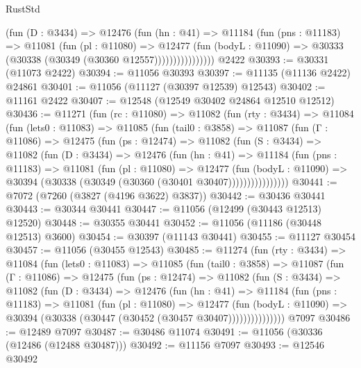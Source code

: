 \begin{lexlean}{RustStd}
\begin{coremodule}
                    (fun (D : @3434) =>
                    @12476
                      (fun (hn : @41) =>
                      @11184
                        (fun (pns : @11183) =>
                        @11081
                          (fun (pl : @11080) =>
                          @12477
                            (fun (bodyL : @11090) =>
                            @30333 (@30338 (@30349 (@30360 @12557))))))))))))))))
    @2422
@30393 := @30331 (@11073 @2422)
@30394 := @11056 @30393
@30397 := @11135 (@11136 @2422) @24861
@30401 := @11056 (@11127 (@30397 @12539) @12543)
@30402 := @11161 @2422
@30407 := @12548 (@12549 @30402 @24864 @12510 @12512)
@30436 := @11271
    (fun (rc : @11080) =>
    @11082
      (fun (rty : @3434) =>
      @11084
        (fun (lets0 : @11083) =>
        @11085
          (fun (tail0 : @3858) =>
          @11087
            (fun (Γ : @11086) =>
            @12475
              (fun (ps : @12474) =>
              @11082
                (fun (S : @3434) =>
                @11082
                  (fun (D : @3434) =>
                  @12476
                    (fun (hn : @41) =>
                    @11184
                      (fun (pns : @11183) =>
                      @11081
                        (fun (pl : @11080) =>
                        @12477
                          (fun (bodyL : @11090) =>
                          @30394 (@30338 (@30349 (@30360 (@30401 @30407))))))))))))))))
@30441 := @7072 (@7260 (@3827 (@4196 @3622) @3837))
@30442 := @30436 @30441
@30443 := @30344 @30441
@30447 := @11056 (@12499 (@30443 @12513) @12520)
@30448 := @30355 @30441
@30452 := @11056 (@11186 (@30448 @12513) @3600)
@30454 := @30397 (@11143 @30441)
@30455 := @11127 @30454
@30457 := @11056 (@30455 @12543)
@30485 := @11274
    (fun (rty : @3434) =>
    @11084
      (fun (lets0 : @11083) =>
      @11085
        (fun (tail0 : @3858) =>
        @11087
          (fun (Γ : @11086) =>
          @12475
            (fun (ps : @12474) =>
            @11082
              (fun (S : @3434) =>
              @11082
                (fun (D : @3434) =>
                @12476
                  (fun (hn : @41) =>
                  @11184
                    (fun (pns : @11183) =>
                    @11081
                      (fun (pl : @11080) =>
                      @12477
                        (fun (bodyL : @11090) =>
                        @30394 (@30338 (@30447 (@30452 (@30457 @30407)))))))))))))))
    @7097
@30486 := @12489 @7097
@30487 := @30486 @11074
@30491 := @11056 (@30336 (@12486 (@12488 @30487)))
@30492 := @11156 @7097
@30493 := @12546 @30492

\end{coremodule}
\end{lexlean}
